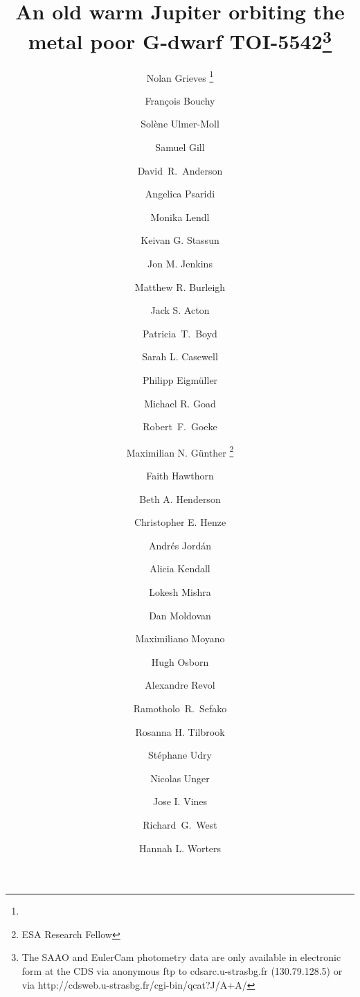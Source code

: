\documentclass{aa}
\begin{document}
 


    \title{An old warm Jupiter orbiting the metal poor G-dwarf TOI-5542\footnote{The SAAO and EulerCam photometry data are only available in electronic form at the CDS via anonymous ftp to cdsarc.u-strasbg.fr (130.79.128.5) or via http://cdsweb.u-strasbg.fr/cgi-bin/qcat?J/A+A/}}


    \author{Nolan Grieves \inst{\ref{inst-geneva}}\fnmsep\thanks{}
    \and Fran\c{c}ois Bouchy \inst{\ref{inst-geneva}}
    \and Sol{\`e}ne Ulmer-Moll\inst{\ref{inst-geneva}}
    \and Samuel Gill\inst{\ref{inst-war},\ref{inst-warexo}}
    \and David~R.~Anderson\inst{\ref{inst-war},\ref{inst-warexo}}
    \and Angelica Psaridi \inst{\ref{inst-geneva}}
    \and Monika Lendl \inst{\ref{inst-geneva}}
    \and Keivan G. Stassun \inst{\ref{inst-vandy}}
    \and Jon M. Jenkins \inst{\ref{inst-ames}}
    \and Matthew R. Burleigh \inst{\ref{inst-leic}}
    \and Jack S. Acton \inst{\ref{inst-leic}}
    \and Patricia~T.~Boyd \inst{\ref{inst-goddard}}
    \and Sarah L. Casewell \inst{\ref{inst-leic}}
    \and Philipp Eigm\"uller\inst{\ref{dlr}}
    \and Michael R. Goad \inst{\ref{inst-leic}}
    \and Robert~F.~Goeke \inst{\ref{inst-mit}}
    \and Maximilian N. G\"unther \inst{\ref{estec}}\thanks{ESA Research Fellow}
    \and Faith Hawthorn \inst{\ref{inst-war},\ref{inst-warexo}}
    \and Beth A. Henderson \inst{\ref{inst-leic}}
    \and Christopher E. Henze \inst{\ref{inst-ames}}
    \and Andr\'es Jord\'an \inst{\ref{inst-uai},\ref{inst-mas}}
    \and Alicia Kendall \inst{\ref{inst-leic}}
    \and Lokesh Mishra \inst{\ref{inst-geneva}}
    \and Dan Moldovan \inst{\ref{inst-google}}
    \and Maximiliano Moyano \inst{\ref{inst-ucn}}
    \and Hugh Osborn \inst{\ref{inst-bern},\ref{inst-mit}}
    \and Alexandre Revol \inst{\ref{inst-geneva}}
    \and Ramotholo~R.~Sefako \inst{\ref{inst-saao}}
    \and Rosanna H. Tilbrook \inst{\ref{inst-leic}}
    \and St\'ephane Udry \inst{\ref{inst-geneva}}
    \and Nicolas Unger \inst{\ref{inst-geneva}}
    \and Jose I. Vines \inst{\ref{inst-uchile}}
    \and Richard~G.~West\inst{\ref{inst-war},\ref{inst-warexo}}
    \and Hannah L. Worters \inst{\ref{inst-saao}}
    }
\end{document}
